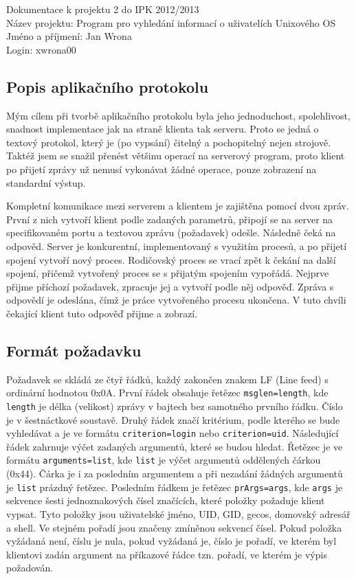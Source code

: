 \documentclass[a4paper, 11pt]{article}[31.03.2013]
\begin{document}
\noindent
Dokumentace k projektu 2 do IPK 2012/2013\\
Název projektu: Program pro vyhledání informací o uživatelích Unixového OS\\
Jméno a příjmení: Jan Wrona\\
Login: xwrona00

\subsection*{Popis aplikačního protokolu}
Mým cílem při tvorbě aplikačního protokolu byla jeho jednoduchost, spolehlivost,
snadnost implementace jak na straně klienta tak serveru. Proto se jedná o textový
protokol, který je (po vypsání) čitelný a pochopitelný nejen strojově. Taktéž jsem
se snažil přenést většinu operací na serverový program, proto klient po přijetí zprávy
už nemusí vykonávat žádné operace, pouze zobrazení na standardní výstup.

Kompletní komunikace mezi serverem a klientem je zajištěna pomocí dvou zpráv.
První z nich vytvoří klient podle zadaných parametrů, připojí se na server na specifikovaném portu
a textovou zprávu (požadavek) odešle. Následně čeká na odpověd. Server je konkurentní, 
implementovaný s využitím procesů, a po přijetí spojení vytvoří nový proces. Rodičovský
proces se vrací zpět k čekání na další spojení, přičemž vytvořený proces se s přijatým
spojením vypořádá. Nejprve přijme příchozí požadavek, zpracuje jej a vytvoří podle něj
odpověď. Zpráva s odpovědí je odeslána, čímž je práce vytvořeného procesu ukončena.
V tuto chvíli čekající klient tuto odpověď přijme a zobrazí.
\subsection*{Formát požadavku}
Požadavek se skládá ze čtyř řádků, každý zakončen znakem LF (Line feed) s ordinární hodnotou
0x0A. První řádek obsahuje řetězec \texttt{msglen=length}, kde \texttt{length} je délka
(velikost) zprávy v bajtech bez samotného prvního řádku. Číslo je v šestnáctkové soustavě. Druhý řádek značí kritérium, 
podle kterého se bude vyhledávat a je ve formátu \texttt{criterion=login} nebo \texttt{criterion=uid}.
Následující řádek zahrnuje výčet zadaných argumentů, které se budou hledat. Řetězec je ve formátu
\texttt{arguments=list}, kde \texttt{list} je výčet argumentů oddělených čárkou (0x44).
Čárka je i za posledním argumentem a při nezadání žádných argumentů je \texttt{list} prázdný řetězec.
Posledním řádkem je řetězec \texttt{prArgs=args}, kde \texttt{args} je sekvence šesti
jednoznakových čísel značících, které položky požaduje klient vypsat. Tyto položky jsou
uživatelské jméno, UID, GID, gecos, domovský adresář a shell. Ve stejném pořadí jsou značeny
zmíněnou sekvencí čísel. Pokud položka vyžádaná není, číslu je nula, pokud vyžádaná je, číslo
je pořadí, ve kterém byl klientovi zadán argument na příkazové řádce tzn. pořadí, ve kterém
je výpis požadován.
\end{document}
